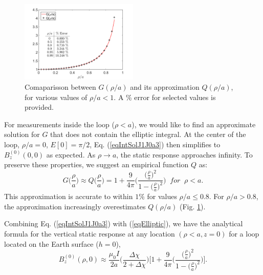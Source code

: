 \documentclass[onecolumn]{IEEEtran} %
\begin{document}
\begin{figure}[!t]
\centering
\includegraphics[width=0.50\textwidth]{DCowanVRM2017/imagesColor/figElliptic.png}
\caption{Comaparisson between $G(\rho /a)$  and its
approximation $Q(\rho /a)$, for various values of $\rho /a < 1$. A
\% error for selected values is provided.} \label{figElliptic}
\end{figure}
%

For measurements inside the loop ($\rho <a$), we would like to find
an approximate solution for $G$ that does not contain the elliptic
integral. At the center of the loop, $\rho /a =0$, $E[0]= \pi /2$,
Eq. (\ref{eqIntSolJ1J0a3}) then simplifies to $B_z^{(0)} (0,0)$ as
expected. As $\rho \rightarrow a$, the static response approaches
infinity. To preserve these properties, we suggest an empirical
function $Q$ as:
\begin{equation}
\label{eqElliptic} G \Big ( \frac{\rho}{a} \Big ) \approx Q \Big (
\frac{\rho}{a} \Big ) = 1 + \frac{9}{4\pi} \Bigg ( \frac{\big(
\frac{\rho}{a} \big )^2}{1- \big( \frac{\rho}{a} \big )^2} \Bigg )
\; \; for \; \; \rho < a.
\end{equation}
This approximation  is accurate to within $1\% $ for values $\rho /
a \leq 0.8$. For $\rho /a > 0.8$, the approximation increasingly
overestimates $Q (\rho /a)$ (Fig. \ref{figElliptic}).

Combining Eq. (\ref{eqIntSolJ1J0a3}) with (\ref{eqElliptic}), we
have the analytical formula for the vertical static response at any
location $(\rho < a,z=0)$ for a loop located on the Earth surface
($h=0$),
\begin{equation}
B^{(0)}_z(\rho,0) \approx \frac{\mu_0 I}{2a}  \Bigg ( \frac{\Delta
\chi}{2+\Delta \chi} \Bigg ) \Bigg [ 1 + \frac{9}{4\pi} \Bigg (
\frac{\big( \frac{\rho}{a} \big )^2}{1- \big( \frac{\rho}{a} \big
)^2} \Bigg ) \Bigg ]. \label{eqStaticLoopBz}
\end{equation}
\\\\
\end{document}
